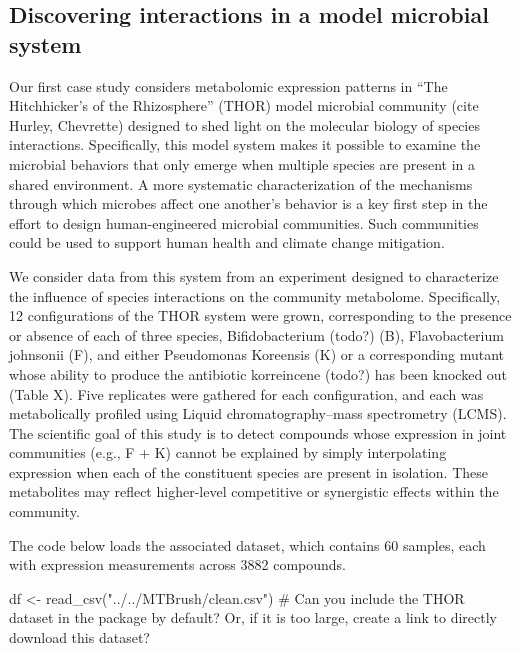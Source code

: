 \hypertarget{discovering-interactions-in-a-model-microbial-system}{%
\subsection{Discovering interactions in a model microbial
system}\label{discovering-interactions-in-a-model-microbial-system}}

Our first case study considers metabolomic expression patterns in ``The
Hitchhicker's of the Rhizosphere'' (THOR) model microbial community
\color{violet}(cite Hurley, Chevrette)\color{black} designed to shed
light on the molecular biology of species interactions. Specifically,
this model system makes it possible to examine the microbial behaviors
that only emerge when multiple species are present in a shared
environment. A more systematic characterization of the mechanisms
through which microbes affect one another's behavior is a key first step
in the effort to design human-engineered microbial communities. Such
communities could be used to support human health and climate change
mitigation.

We consider data from this system from an experiment designed to
characterize the influence of species interactions on the community
metabolome. Specifically, 12 configurations of the THOR system were
grown, corresponding to the presence or absence of each of three
species, Bifidobacterium (todo?) (B), Flavobacterium johnsonii (F), and
either Pseudomonas Koreensis (K) or a corresponding mutant whose ability
to produce the antibiotic korreincene (todo?) has been knocked out
(Table X). Five replicates were gathered for each configuration, and
each was metabolically profiled using Liquid chromatography--mass
spectrometry (LCMS). The scientific goal of this study is to detect
compounds whose expression in joint communities (e.g., F + K) cannot be
explained by simply interpolating expression when each of the
constituent species are present in isolation. These metabolites may
reflect higher-level competitive or synergistic effects within the
community.

The code below loads the associated dataset, which contains 60 samples,
each with expression measurements across 3882 compounds.

\color{violet}

\begin{Schunk}
\begin{Sinput}
df <- read_csv("../../MTBrush/clean.csv") # Can you include the THOR dataset in the package by default? Or, if it is too large, create a link to directly download this dataset?
\end{Sinput}
\end{Schunk}


